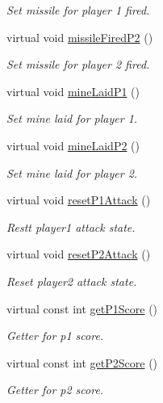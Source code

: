 \begin{DoxyCompactItemize}
\begin{DoxyCompactList}\small\item\em Set missile for player 1 fired. \end{DoxyCompactList}\item 
virtual void \hyperlink{classGameManagementData_ae55ccfb644fc58de62c42779dbf710c4}{missile\-Fired\-P2} ()
\begin{DoxyCompactList}\small\item\em Set missile for player 2 fired. \end{DoxyCompactList}\item 
virtual void \hyperlink{classGameManagementData_a5450f20ab4ad8d8f81c4d673ea72bfc2}{mine\-Laid\-P1} ()
\begin{DoxyCompactList}\small\item\em Set mine laid for player 1. \end{DoxyCompactList}\item 
virtual void \hyperlink{classGameManagementData_a794b882a00b5c979e59590db0c452828}{mine\-Laid\-P2} ()
\begin{DoxyCompactList}\small\item\em Set mine laid for player 2. \end{DoxyCompactList}\item 
virtual void \hyperlink{classGameManagementData_a82c3d16a50fb6e79a3b9aaca2272d000}{reset\-P1\-Attack} ()
\begin{DoxyCompactList}\small\item\em Restt player1 attack state. \end{DoxyCompactList}\item 
virtual void \hyperlink{classGameManagementData_a3434062fcb5872de24787b2cfa49b605}{reset\-P2\-Attack} ()
\begin{DoxyCompactList}\small\item\em Reset player2 attack state. \end{DoxyCompactList}\item 
virtual const int \hyperlink{classGameManagementData_a2738ec4d85bdb87f957d21e8a314e502}{get\-P1\-Score} ()
\begin{DoxyCompactList}\small\item\em Getter for p1 score. \end{DoxyCompactList}\item 
virtual const int \hyperlink{classGameManagementData_ad1d991be2ab8b8f814ef6898dd887d15}{get\-P2\-Score} ()
\begin{DoxyCompactList}\small\item\em Getter for p2 score. \end{DoxyCompactList}\item 

\end{DoxyCompactItemize}
